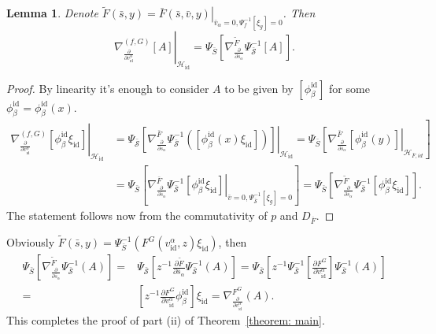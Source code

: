 \documentclass[reqno,12pt]{amsart}
\numberwithin{equation}{section}
\theoremstyle{plain}
\newtheorem{lemma}[theorem]{Lemma}
\theoremstyle{definition}
\newcommand{\id}{\mathrm{id}}
\def\H{{\mathcal H}}
\numberwithin{equation}{section}
\begin{document}
\begin{lemma}
    Denote $\widetilde{F}(\bar{s},y) = \left.\bar{F}(\bar{s}, \bar{v}, y)\right\vert_{\bar{v}_\alpha =0, \Psi^{-1}_{f}[\xi_g] = 0}$. Then
    \[
    \left.\nabla_{\frac{\partial}{\partial v^\alpha_{\id}}}^{(f,G)}[A]\right\vert_{\H_{\id}} 
    =  
    \Psi_{\bar{S}} \left[\nabla^{\widetilde{F}}_{\frac{\partial}{\partial \bar{s}_\alpha}}\Psi_{\mathcal{\bar{S}}}^{-1}[A]\right].
    \]
\end{lemma}
\begin{proof}
    By linearity it's enough to consider $A$ to be given by $[\phi_\beta^{\id}]$ for some $\phi_\beta^{\id} = \phi_\beta^{\id}(x)$.
\begin{align*}
    \left.\nabla_{\frac{\partial}{\partial v^\alpha_{\id}}}^{(f,G)}[\phi_\beta^{\id} \xi_{\id}]\right\vert_{\H_{\id}} 
    &= \left.\Psi_{\bar{\mathcal{S}}} \left[ \nabla^{\bar{F}}_{\frac{\partial}{\partial s_{\alpha}}} \Psi^{-1}_{\bar{\mathcal{S}}}([\phi^{\id}_{\beta}(x) \xi_{\id}]) \right]\right\vert_{\H_{\id}} 
    = \left.\Psi_{\bar{S}} \left[\nabla^{\bar{F}}_{\frac{\partial}{\partial \bar{s}_\alpha}}[\phi^{\id}_{\beta}(y)]\right\vert_{\H_{\bar{F},id}} \right] 
    \\
    &= \Psi_{\bar{S}} \left[ \left.\nabla^{\bar{F}}_{\frac{\partial}{\partial \bar{s}_\alpha}}\Psi_{\mathcal{\bar{S}}}^{-1}[\phi^{\id}_{\beta} \xi_{\id}]\right\vert_{\bar{v} =0, \Psi^{-1}_{\mathcal{\bar{S}}}[\xi_g] = 0} \right] = \Psi_{\bar{S}} \left[\nabla^{\widetilde{F}}_{\frac{\partial}{\partial \bar{s}_\alpha}}\Psi_{\mathcal{\bar{S}}}^{-1}[\phi^{\id}_{\beta} \xi_{\id}]\right].
\end{align*}
The statement follows now from the commutativity of $p$ and $D_{\overline{F}}$.
\end{proof}

Obviously $\widetilde{F}(\bar{s},y) = \Psi^{-1}_{\bar{S}} (F^G(v_{\id}^{\alpha}, z)\xi_{\id})$, then
\begin{align*}
    \Psi_{\bar{S}} \left[\nabla^{\tilde{F}}_{\frac{\partial}{\partial \bar{s}_\alpha}}\Psi_{\mathcal{\bar{S}}}^{-1}(A)\right] 
    =& \Psi_{\bar{\mathcal{S}}} \left[z^{-1}\frac{\partial \tilde{F}}{\partial \bar{s}_\alpha}\Psi_{\mathcal{\bar{S}}}^{-1}(A)\right] 
    =  \Psi_{\bar{\mathcal{S}}} \left[z^{-1}\Psi_{\mathcal{\bar{S}}}^{-1}[\frac{\partial F^G}{\partial v_{\id}^{\alpha}}]\Psi_{\mathcal{\bar{S}}}^{-1}(A)\right] 
    \\ 
    =& \left[z^{-1}\frac{\partial F^G}{\partial v_{\id}^{\alpha}}\phi^{\id}_{\beta}\right]\xi_{\id} = \nabla^{F^G}_{\frac{\partial}{\partial v_{\id}^\alpha}}(A).
\end{align*}
This completes the proof of part (ii) of Theorem~\ref{theorem: main}.
\end{document}

